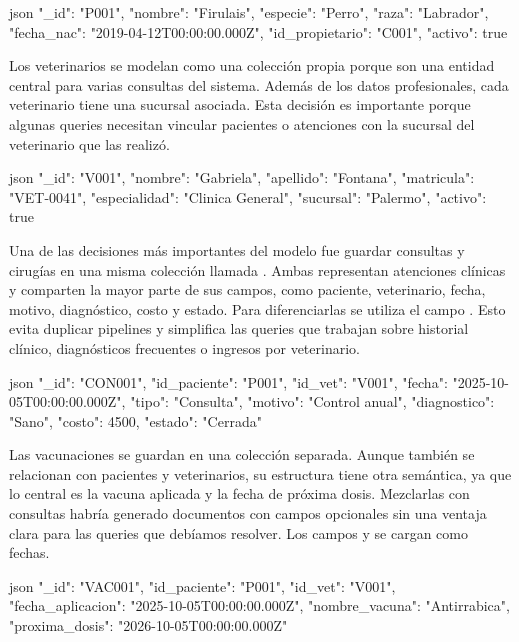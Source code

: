 \documentclass[10pt,a4paper]{article}
\newcommand{\code}[1]{\codeinline{#1}}
\begin{document}
\begin{codeblock}{json}
{
  "_id": "P001",
  "nombre": "Firulais",
  "especie": "Perro",
  "raza": "Labrador",
  "fecha_nac": "2019-04-12T00:00:00.000Z",
  "id_propietario": "C001",
  "activo": true
}
\end{codeblock}

Los veterinarios se modelan como una colección propia porque son una entidad central para varias consultas del sistema. Además de los datos profesionales, cada veterinario tiene una sucursal asociada. Esta decisión es importante porque algunas queries necesitan vincular pacientes o atenciones con la sucursal del veterinario que las realizó.

\begin{codeblock}{json}
{
  "_id": "V001",
  "nombre": "Gabriela",
  "apellido": "Fontana",
  "matricula": "VET-0041",
  "especialidad": "Clinica General",
  "sucursal": "Palermo",
  "activo": true
}
\end{codeblock}

Una de las decisiones más importantes del modelo fue guardar consultas y cirugías en una misma colección llamada \code{consultas}. Ambas representan atenciones clínicas y comparten la mayor parte de sus campos, como paciente, veterinario, fecha, motivo, diagnóstico, costo y estado. Para diferenciarlas se utiliza el campo \code{tipo}. Esto evita duplicar pipelines y simplifica las queries que trabajan sobre historial clínico, diagnósticos frecuentes o ingresos por veterinario.

\begin{codeblock}{json}
{
  "_id": "CON001",
  "id_paciente": "P001",
  "id_vet": "V001",
  "fecha": "2025-10-05T00:00:00.000Z",
  "tipo": "Consulta",
  "motivo": "Control anual",
  "diagnostico": "Sano",
  "costo": 4500,
  "estado": "Cerrada"
}
\end{codeblock}

Las vacunaciones se guardan en una colección separada. Aunque también se relacionan con pacientes y veterinarios, su estructura tiene otra semántica, ya que lo central es la vacuna aplicada y la fecha de próxima dosis. Mezclarlas con consultas habría generado documentos con campos opcionales sin una ventaja clara para las queries que debíamos resolver. Los campos \code{fecha\_aplicacion} y \code{proxima\_dosis} se cargan como fechas.

\begin{codeblock}{json}
{
  "_id": "VAC001",
  "id_paciente": "P001",
  "id_vet": "V001",
  "fecha_aplicacion": "2025-10-05T00:00:00.000Z",
  "nombre_vacuna": "Antirrabica",
  "proxima_dosis": "2026-10-05T00:00:00.000Z"
}
\end{codeblock}
\end{document}
